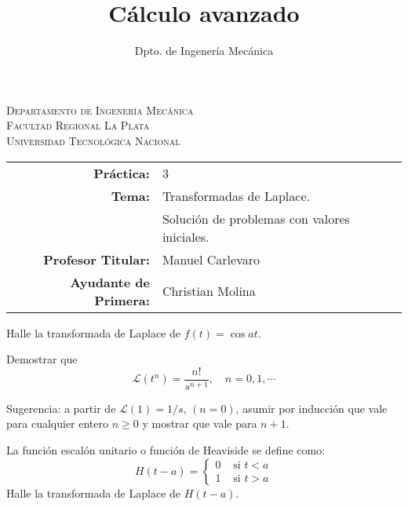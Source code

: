 \documentclass[11pt]{article}
\title{Cálculo avanzado}
\author{Dpto. de Ingenería Mecánica}
\begin{document}
\begin{center}
\end{center}

\begin{center}
	\vspace{\baselineskip}
	\Large{\textsc{Departamento de Ingenería Mecánica}} \\
	\textsc{Facultad Regional La Plata} \\
	\textsc{Universidad Tecnológica Nacional}
\end{center}

\vspace{1em}

\begin{center}
	\begin{tabular}{rl}
		\textbf{Práctica:}            & 3                                            \\
		\textbf{Tema:}                & Transformadas de Laplace.                    \\
		                              & Solución de problemas con valores iniciales. \\
		\textbf{Profesor Titular:}    & Manuel Carlevaro                             \\
		\textbf{Ayudante de Primera:} & Christian Molina                             \\
	\end{tabular}
\end{center}

\vspace{1em}

\begin{question} %
	Halle la transformada de Laplace de $f(t) = \cos at$.
\end{question}

\begin{question}
	Demostrar que
	\[ \mathscr{L}(t^n) = \frac{n!}{s^{n + 1}}, \quad n = 0, 1, \cdots \]

	Sugerencia: a partir de $\mathscr{L}(1) = 1 / s, \, (n = 0)$, asumir por inducción que vale para cualquier entero $n \geq 0$ y mostrar que vale para $n + 1$.
\end{question}

\begin{question} %
	La función escalón unitario o función de Heaviside se define como:
	\[ H(t - a) =
		\begin{cases}
			0 & \text{ si } t < a \\
			1 & \text{ si } t > a
		\end{cases}
	\]
	Halle la transformada de Laplace de $H(t - a)$.
\end{question}
\end{document}
